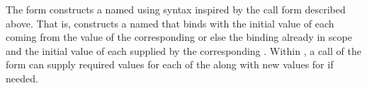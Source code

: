 The  form constructs a named  using
syntax inspired by the call form described above.
That is,
constructs a named  
that binds 
with the initial value of each  coming from
the value of the corresponding 
or else the binding already in scope
and the initial value of each  supplied by
the corresponding .
Within , a call
of the form 
can supply required values for each of the 
along with new values for  \etc{} if needed.
